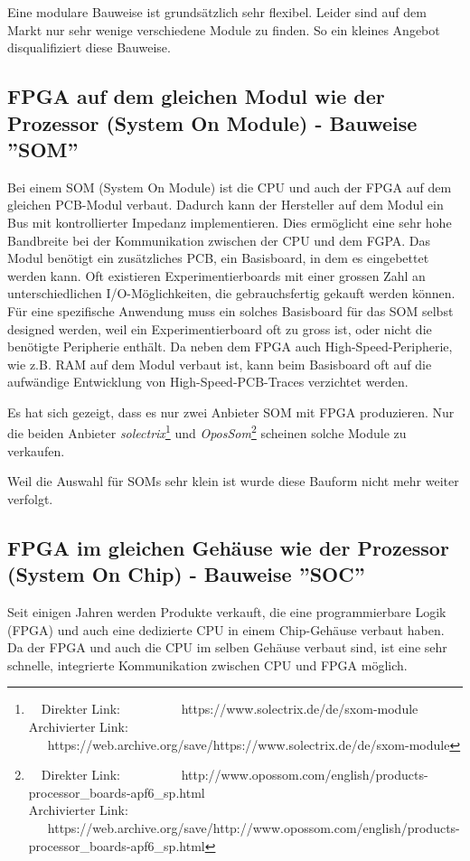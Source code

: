Eine modulare Bauweise ist grundsätzlich sehr flexibel.
Leider sind auf dem Markt nur sehr wenige verschiedene Module zu finden.
So ein kleines Angebot disqualifiziert diese Bauweise.


\subsection{FPGA auf dem gleichen Modul wie der Prozessor (System On Module) - Bauweise ''SOM''}
Bei einem SOM (System On Module) ist die CPU und auch der FPGA auf dem gleichen PCB-Modul verbaut.
Dadurch kann der Hersteller auf dem Modul ein Bus mit kontrollierter Impedanz implementieren.
Dies ermöglicht eine sehr hohe Bandbreite bei der Kommunikation zwischen der CPU und dem FGPA.
Das Modul benötigt ein zusätzliches PCB, ein Basisboard, in dem es eingebettet werden kann.
Oft existieren Experimentierboards mit einer grossen Zahl an unterschiedlichen I/O-Möglichkeiten, die gebrauchsfertig gekauft werden können.
Für eine spezifische Anwendung muss ein solches Basisboard für das SOM selbst designed werden, weil ein Experimentierboard oft zu gross ist, oder nicht die benötigte Peripherie enthält.
Da neben dem FPGA auch High-Speed-Peripherie, wie z.B. RAM auf dem Modul verbaut ist, kann beim Basisboard oft auf die aufwändige Entwicklung von High-Speed-PCB-Traces verzichtet werden.


Es hat sich gezeigt, dass es nur zwei Anbieter SOM mit FPGA produzieren.
Nur die beiden Anbieter \textit{solectrix}\footnote{\ \ Direkter Link: \ \ \ \ \ \ \ \ \ https://www.solectrix.de/de/sxom-module\\ Archivierter Link: \ \ \ https://web.archive.org/save/https://www.solectrix.de/de/sxom-module} und \textit{OposSom}\footnote{\ \ Direkter Link: \ \ \ \ \ \ \ \ \ http://www.opossom.com/english/products-processor\_boards-apf6\_sp.html\\ Archivierter Link: \ \ \ https://web.archive.org/save/http://www.opossom.com/english/products-processor\_boards-apf6\_sp.html} scheinen solche Module zu verkaufen.

Weil die Auswahl für SOMs sehr klein ist wurde diese Bauform nicht mehr weiter verfolgt.

 
\subsection{FPGA im gleichen Gehäuse wie der Prozessor (System On Chip) - Bauweise ''SOC''}
Seit einigen Jahren werden Produkte verkauft, die eine programmierbare Logik (FPGA) und auch eine dedizierte CPU in einem Chip-Gehäuse verbaut haben.
Da der FPGA und auch die CPU im selben Gehäuse verbaut sind, ist eine sehr schnelle, integrierte Kommunikation zwischen CPU und FPGA möglich.

